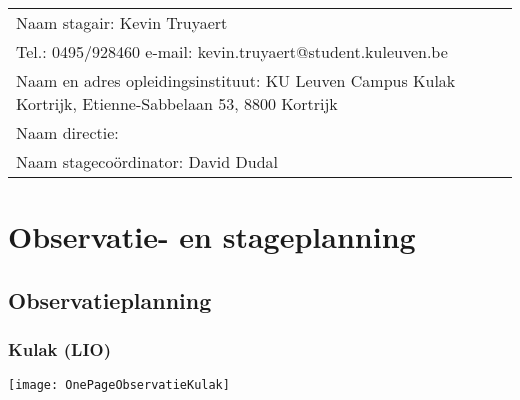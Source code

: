 
\begin{landscape}
	
	\begin{tabularx}{1.56\textwidth}{|X|}
		\hline
		Naam stagair:  Kevin Truyaert  \\
		Tel.: 0495/928460 \hspace{3cm} e-mail: kevin.truyaert@student.kuleuven.be  \\
		Naam en adres opleidingsinstituut:  KU Leuven Campus Kulak Kortrijk, Etienne-Sabbelaan 53, 8800 Kortrijk  \\
		Naam directie: \\
		Naam stagecoördinator:  David Dudal \\
		\hline
	\end{tabularx}
	\vspace*{-0.4cm}
\section{Observatie- en stageplanning}
\vspace*{-0.3cm}\subsection{Observatieplanning}
\subsubsection{Kulak (LIO)}%
\vspace*{-0.5cm}
\begin{center}
		\texttt{[image: OnePageObservatieKulak]}
\end{center}


\end{landscape}
